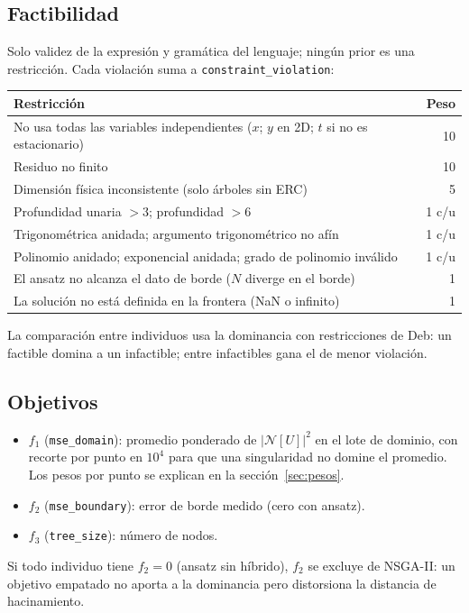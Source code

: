 \documentclass[11pt,a4paper]{article}
\newcommand{\code}[1]{\texttt{\small #1}}
\begin{document}
\subsection{Factibilidad}
Solo validez de la expresión y gramática del lenguaje; ningún prior es una restricción. Cada violación
suma a \code{constraint\_violation}:
\begin{center}\small
\begin{tabular}{@{}lr@{}}\toprule
Restricción & Peso\\\midrule
No usa todas las variables independientes ($x$; $y$ en 2D; $t$ si no es estacionario) & 10\\
Residuo no finito & 10\\
Dimensión física inconsistente (solo árboles sin ERC) & 5\\
Profundidad unaria $>3$; profundidad $>6$ & 1 c/u\\
Trigonométrica anidada; argumento trigonométrico no afín & 1 c/u\\
Polinomio anidado; exponencial anidada; grado de polinomio inválido & 1 c/u\\
El ansatz no alcanza el dato de borde ($N$ diverge en el borde) & 1\\
La solución no está definida en la frontera (NaN o infinito) & 1\\\bottomrule
\end{tabular}\end{center}
La comparación entre individuos usa la dominancia con restricciones de Deb: un factible domina a un
infactible; entre infactibles gana el de menor violación.

\subsection{Objetivos}
\begin{itemize}
\item $f_1$ (\code{mse\_domain}): promedio ponderado de $|\mathcal N[U]|^2$ en el lote de dominio, con
  recorte por punto en $10^4$ para que una singularidad no domine el promedio. Los pesos por punto se
  explican en la sección~\ref{sec:pesos}.
\item $f_2$ (\code{mse\_boundary}): error de borde medido (cero con ansatz).
\item $f_3$ (\code{tree\_size}): número de nodos.
\end{itemize}
Si todo individuo tiene $f_2=0$ (ansatz sin híbrido), $f_2$ se excluye de NSGA-II: un objetivo empatado
no aporta a la dominancia pero distorsiona la distancia de hacinamiento.
\end{document}

